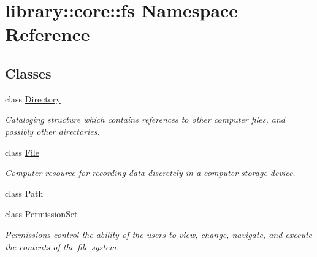 \hypertarget{namespacelibrary_1_1core_1_1fs}{}\section{library\+::core\+::fs Namespace Reference}
\label{namespacelibrary_1_1core_1_1fs}
\subsection*{Classes}
\begin{DoxyCompactItemize}
\item 
class \mbox{\hyperlink{classlibrary_1_1core_1_1fs_1_1_directory}{Directory}}
\begin{DoxyCompactList}\small\item\em Cataloging structure which contains references to other computer files, and possibly other directories. \end{DoxyCompactList}\item 
class \mbox{\hyperlink{classlibrary_1_1core_1_1fs_1_1_file}{File}}
\begin{DoxyCompactList}\small\item\em Computer resource for recording data discretely in a computer storage device. \end{DoxyCompactList}\item 
class \mbox{\hyperlink{classlibrary_1_1core_1_1fs_1_1_path}{Path}}
\item 
class \mbox{\hyperlink{classlibrary_1_1core_1_1fs_1_1_permission_set}{Permission\+Set}}
\begin{DoxyCompactList}\small\item\em Permissions control the ability of the users to view, change, navigate, and execute the contents of the file system. \end{DoxyCompactList}\end{DoxyCompactItemize}

